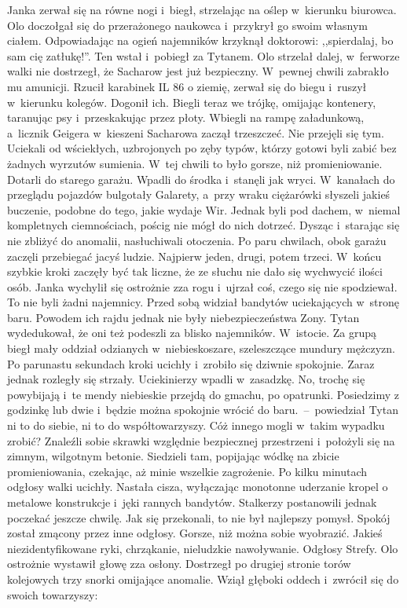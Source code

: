 \documentclass[../MAIN.tex]{subfiles}
\begin{document}
\pp
Janka zerwał się na równe nogi i~biegł, strzelając na oślep w~kierunku biurowca. Olo doczołgał się do przerażonego naukowca i~przykrył go swoim własnym ciałem. Odpowiadając na ogień najemników krzyknął doktorowi: ,,spierdalaj, bo sam cię zatłukę!''. Ten wstał i~pobiegł za Tytanem. Olo strzelał dalej, w~ferworze walki nie dostrzegł, że Sacharow jest już bezpieczny. W~pewnej chwili zabrakło mu amunicji. Rzucił karabinek IL 86 o ziemię, zerwał się do biegu i~ruszył w~kierunku kolegów. Dogonił ich. Biegli teraz we trójkę, omijając kontenery, taranując psy i~przeskakując przez płoty. Wbiegli na rampę załadunkową, a~licznik Geigera w~kieszeni Sacharowa zaczął trzeszczeć. Nie przejęli się tym. Uciekali od wściekłych, uzbrojonych po zęby typów, którzy gotowi byli zabić bez żadnych wyrzutów sumienia. W~tej chwili to było gorsze, niż promieniowanie. Dotarli do starego garażu. Wpadli do środka i~stanęli jak wryci. W~kanałach do przeglądu pojazdów bulgotały Galarety, a~przy wraku ciężarówki słyszeli jakieś buczenie,
podobne do tego, jakie wydaje Wir. Jednak byli pod dachem, w~niemal kompletnych ciemnościach, pościg nie mógł do nich dotrzeć.
\pp
Dysząc i~starając się nie zbliżyć do anomalii, nasłuchiwali otoczenia. Po paru chwilach, obok garażu zaczęli przebiegać jacyś ludzie. Najpierw jeden, drugi, potem trzeci. W~końcu szybkie kroki zaczęły być tak liczne, że ze słuchu nie dało się wychwycić ilości osób. Janka wychylił się ostrożnie zza rogu i~ujrzał coś, czego się nie spodziewał. To nie byli żadni najemnicy. Przed sobą widział bandytów uciekających w~stronę baru. Powodem ich rajdu jednak nie były niebezpieczeństwa Zony. Tytan wydedukował, że oni też podeszli za blisko najemników. W~istocie. Za grupą biegł mały oddział odzianych w~niebieskoszare, szeleszczące mundury mężczyzn. Po parunastu sekundach kroki ucichły i~zrobiło się dziwnie spokojnie.
\pp
Zaraz jednak rozległy się strzały. Uciekinierzy wpadli w~zasadzkę.
\sx No, trochę się powybijają i~te mendy niebieskie przejdą do gmachu, po opatrunki. Posiedzimy z godzinkę lub dwie i~będzie można spokojnie wrócić do baru.~--~powiedział Tytan ni to do siebie, ni to do współtowarzyszy.
\qd
\hspace{31.4em}Cóż innego mogli w~takim wypadku zrobić? Znaleźli sobie skrawki względnie bezpiecznej przestrzeni i~położyli się na zimnym, wilgotnym betonie. Siedzieli tam, popijając wódkę na zbicie promieniowania, czekając, aż minie wszelkie zagrożenie. Po kilku minutach odgłosy walki ucichły. Nastała cisza, wyłączając monotonne uderzanie kropel o metalowe konstrukcje i~jęki rannych bandytów. Stalkerzy postanowili jednak poczekać jeszcze chwilę. Jak się przekonali, to nie był najlepszy pomysł. Spokój został zmącony przez inne odgłosy. Gorsze, niż można sobie wyobrazić. Jakieś niezidentyfikowane ryki, chrząkanie, nieludzkie nawoływanie. Odgłosy Strefy. Olo ostrożnie wystawił głowę zza osłony. Dostrzegł po drugiej stronie torów kolejowych trzy snorki omijające anomalie. Wziął głęboki oddech i~zwrócił się do swoich towarzyszy:
\end{document}
